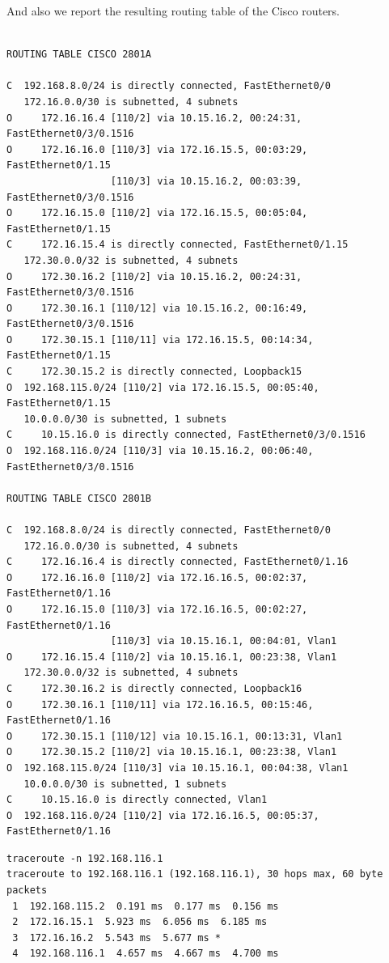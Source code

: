 \documentclass{llncs}
\begin{document}
And also we report the resulting routing table of the Cisco routers.
\lstset{language=sh, caption=Router Cisco 2801A and 2801B resulting routing,  basicstyle=\ttfamily\scriptsize , breaklines=true}
\begin{lstlisting}

ROUTING TABLE CISCO 2801A

C  192.168.8.0/24 is directly connected, FastEthernet0/0
   172.16.0.0/30 is subnetted, 4 subnets
O     172.16.16.4 [110/2] via 10.15.16.2, 00:24:31, FastEthernet0/3/0.1516
O     172.16.16.0 [110/3] via 172.16.15.5, 00:03:29, FastEthernet0/1.15
                  [110/3] via 10.15.16.2, 00:03:39, FastEthernet0/3/0.1516
O     172.16.15.0 [110/2] via 172.16.15.5, 00:05:04, FastEthernet0/1.15
C     172.16.15.4 is directly connected, FastEthernet0/1.15
   172.30.0.0/32 is subnetted, 4 subnets
O     172.30.16.2 [110/2] via 10.15.16.2, 00:24:31, FastEthernet0/3/0.1516
O     172.30.16.1 [110/12] via 10.15.16.2, 00:16:49, FastEthernet0/3/0.1516
O     172.30.15.1 [110/11] via 172.16.15.5, 00:14:34, FastEthernet0/1.15
C     172.30.15.2 is directly connected, Loopback15
O  192.168.115.0/24 [110/2] via 172.16.15.5, 00:05:40, FastEthernet0/1.15
   10.0.0.0/30 is subnetted, 1 subnets
C     10.15.16.0 is directly connected, FastEthernet0/3/0.1516
O  192.168.116.0/24 [110/3] via 10.15.16.2, 00:06:40, FastEthernet0/3/0.1516

ROUTING TABLE CISCO 2801B

C  192.168.8.0/24 is directly connected, FastEthernet0/0
   172.16.0.0/30 is subnetted, 4 subnets
C     172.16.16.4 is directly connected, FastEthernet0/1.16
O     172.16.16.0 [110/2] via 172.16.16.5, 00:02:37, FastEthernet0/1.16
O     172.16.15.0 [110/3] via 172.16.16.5, 00:02:27, FastEthernet0/1.16
                  [110/3] via 10.15.16.1, 00:04:01, Vlan1
O     172.16.15.4 [110/2] via 10.15.16.1, 00:23:38, Vlan1
   172.30.0.0/32 is subnetted, 4 subnets
C     172.30.16.2 is directly connected, Loopback16
O     172.30.16.1 [110/11] via 172.16.16.5, 00:15:46, FastEthernet0/1.16
O     172.30.15.1 [110/12] via 10.15.16.1, 00:13:31, Vlan1
O     172.30.15.2 [110/2] via 10.15.16.1, 00:23:38, Vlan1
O  192.168.115.0/24 [110/3] via 10.15.16.1, 00:04:38, Vlan1
   10.0.0.0/30 is subnetted, 1 subnets
C     10.15.16.0 is directly connected, Vlan1
O  192.168.116.0/24 [110/2] via 172.16.16.5, 00:05:37, FastEthernet0/1.16
\end{lstlisting}


\lstset{language=sh, caption=Traceroute from netlab15 host to netlab16 host,  basicstyle=\ttfamily\scriptsize , breaklines=true}
\begin{lstlisting}
traceroute -n 192.168.116.1
traceroute to 192.168.116.1 (192.168.116.1), 30 hops max, 60 byte packets
 1  192.168.115.2  0.191 ms  0.177 ms  0.156 ms
 2  172.16.15.1  5.923 ms  6.056 ms  6.185 ms
 3  172.16.16.2  5.543 ms  5.677 ms *
 4  192.168.116.1  4.657 ms  4.667 ms  4.700 ms
\end{lstlisting}
\end{document}
